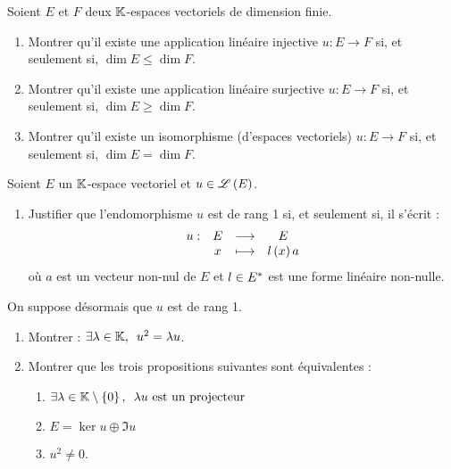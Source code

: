 \begin{exo}
Soient \(E\) et \(F\) deux \(\mathbb{K}\)-espaces vectoriels de dimension finie.

\begin{enumerate}
\item Montrer qu'il existe une application linéaire injective \(u:E\to F\) si, et seulement si, \(\dim E\leq\dim F\). \\

\item Montrer qu'il existe une application linéaire surjective \(u:E\to F\) si, et seulement si, \(\dim E\geq\dim F\). \\

\item Montrer qu'il existe un isomorphisme (d'espaces vectoriels) \(u:E\to F\) si, et seulement si, \(\dim E=\dim F\).
\end{enumerate}
\end{exo}

\begin{corr}
\end{corr}

\begin{exo}
Soient \(E\) un \(\mathbb{K}\)-espace vectoriel et \(u\in\mathscr{L}\left(E\right)\).

\begin{enumerate}[series=endoRG1]
\item Justifier que l'endomorphisme \(u\) est de rang 1 si, et seulement si, il s'écrit : \[\begin{array}[t]{cccc}u : & E & \longrightarrow & E \\ & x & \longmapsto & l\left(x\right)a\end{array}\] où \(a\) est un vecteur non-nul de \(E\) et \(l\in E^{*}\) est une forme linéaire non-nulle. \\
\end{enumerate}

On suppose désormais que \(u\) est de rang 1.

\begin{enumerate}[resume=endoRG1]
\item Montrer : \(\quantifs{\exists\lambda\in\K}u^2=\lambda u\). \\

\item Montrer que les trois propositions suivantes sont équivalentes :

\begin{enumerate}
\item \(\quantifs{\exists\lambda\in\K\excluant\accol{0}}\lambda u\text{ est un projecteur}\) \\

\item \(E=\ker u\oplus\Im u\) \\

\item \(u^2\not=0\).
\end{enumerate}
\end{enumerate}
\end{exo}


